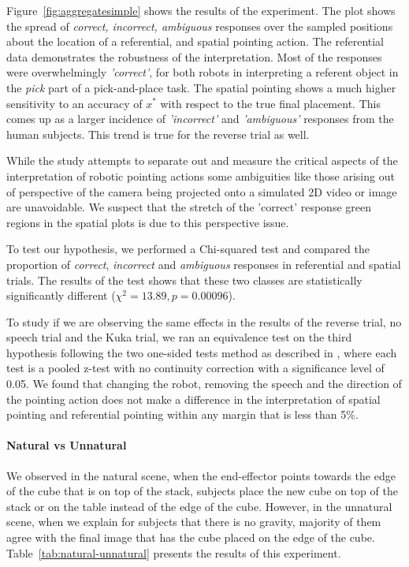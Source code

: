 Figure~\ref{fig:aggregatesimple} shows the results of the experiment. The plot shows the spread of \textit{correct, incorrect, ambiguous} responses over the sampled positions about the location of a referential, and spatial pointing action. The referential data demonstrates the robustness of the interpretation. Most of the responses were overwhelmingly \textit{'correct'}, for both robots in interpreting a referent object in the \textit{pick} part of a pick-and-place task. The spatial pointing shows a much higher sensitivity to an accuracy of $x^*$ with respect to the true final placement. This comes up as a larger incidence of \textit{'incorrect'} and \textit{'ambiguous'} responses from the human subjects. This trend is true for the reverse trial as well.

While the study attempts to separate out and measure the critical aspects of the interpretation of robotic pointing actions some ambiguities like those arising out of perspective of the camera being projected onto a simulated 2D video or image are unavoidable. We suspect that the stretch of the 'correct' response green regions in the spatial plots is due to this perspective issue.

To test our hypothesis, we performed a Chi-squared test and compared the proportion of \textit{correct}, \textit{incorrect} and \textit{ambiguous} responses in referential and spatial trials. The results of the test shows that these two classes are statistically significantly different ($\chi^2= 13.89, p = 0.00096$).

To study if we are observing the same effects in the results of the reverse trial, no speech trial and the Kuka trial, we ran an equivalence test on the third hypothesis following the two one-sided tests method as described in \cite{lakens2017equivalence}, where each test is a pooled z-test with no continuity
correction with a significance level of 0.05. We found that changing the robot, removing the speech and the direction of the pointing action does not make a difference in the interpretation of spatial pointing and referential pointing within any margin that is less than 5\%.



\paragraph{Natural vs Unnatural}

We observed in the natural scene, when the end-effector points towards the edge of the cube that is on top of the stack, subjects place the new cube on top of the stack or on the table instead of the edge of the cube. However, in the unnatural scene, when we explain for subjects that there is no gravity, majority of them agree with the final image that has the cube placed on the edge of the cube. Table~\ref{tab:natural-unnatural} presents the results of this experiment. 

